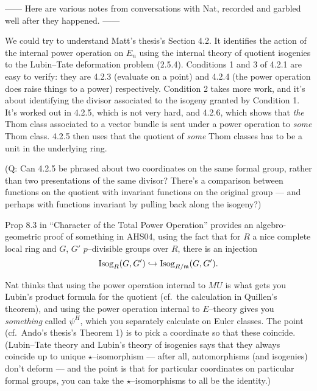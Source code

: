 


------ Here are various notes from conversations with Nat, recorded and garbled well after they happened. ------

We could try to understand Matt's thesis's Section 4.2.  It identifies the action of the internal power operation on $E_n$ using the internal theory of quotient isogenies to the Lubin--Tate deformation problem (2.5.4).  Conditions 1 and 3 of 4.2.1 are easy to verify: they are 4.2.3 (evaluate on a point) and 4.2.4 (the power operation does raise things to a power) respectively.  Condition 2 takes more work, and it's about identifying the divisor associated to the isogeny granted by Condition 1.  It's worked out in 4.2.5, which is not very hard, and 4.2.6, which shows that \emph{the} Thom class associated to a vector bundle is sent under a power operation to \emph{some} Thom class.  4.2.5 then uses that the quotient of \emph{some} Thom classes has to be a unit in the underlying ring.

(Q: Can 4.2.5 be phrased about two coordinates on the same formal group, rather than two presentations of the same divisor?  There's a comparison between functions on the quotient with invariant functions on the original group --- and perhaps with functions invariant by pulling back along the isogeny?)

Prop 8.3 in ``Character of the Total Power Operation'' provides an algebro-geometric proof of something in AHS04, using the fact that for $R$ a nice complete local ring and $G$, $G'$ $p$--divisible groups over $R$, there is an injection \[\operatorname{Isog}_R(G, G') \hookrightarrow \operatorname{Isog}_{R/\mathfrak m}(G, G').\]

Nat thinks that using the power operation internal to $MU$ is what gets you Lubin's product formula for the quotient (cf.\ the calculation in Quillen's theorem), and using the power operation internal to $E$--theory gives you \emph{something} called $\psi^H$, which you separately calculate on Euler classes.  The point (cf.\ Ando's thesis's Theorem 1) is to pick a coordinate so that these coincide.  (Lubin--Tate theory and Lubin's theory of isogenies says that they always coincide up to unique $\star$--isomorphism --- after all, automorphisms (and isogenies) don't deform --- and the point is that for particular coordinates on particular formal groups, you can take the $\star$--isomorphisms to all be the identity.)

